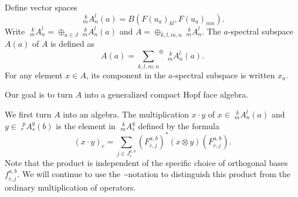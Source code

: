\documentclass[12pt]{article}
\theoremstyle{change}
\newcommand{\CatC}{\mathcal{C}}
\newcommand{\Mor}{\mathrm{Mor}}
\newcommand{\Gr}[5]{\;{}^{\;#2}_{#4}#1_{#5}^{#3}}%
\newcommand{\iitimes}{\underset{I}{\otimes}}
\newcommand{\osum}[1]{\underset{#1}{\sum}^{\oplus}}
\theoremstyle{definition}
\numberwithin{equation}{section}
\begin{document}


Define vector spaces \[\Gr{A}{k}{l}{m}{n}(a) = B(F(u_a)_{kl}, F(u_a)_{mn}).\] Write $\Gr{A}{k}{l}{m}{n} = \oplus_{a\in J} \Gr{A}{k}{l}{m}{n}(a)$ and $A = \oplus_{k,l,m,n} \Gr{A}{k}{l}{m}{n}$. The $a$-spectral subspace $A(a)$ of $A$ is defined as \[A(a) = \osum{k,l,m,n} \Gr{A}{k}{l}{m}{n}(a).\] For any element $x\in A$, its component in the $a$-spectral subspace is written $x_a$.

Our goal is to turn $A$ into a generalized compact Hopf face algebra.



We first turn $A$ into an algebra. The multiplication $x\cdot y$ of $x\in \Gr{A}{k}{l}{m}{n}(a)$ and $y\in \Gr{A}{p}{q}{r}{s}(b)$ is the element in $\Gr{A}{k}{q}{m}{s}$ defined by the formula \[(x\cdot y)_c = \sum_{j\in J^{a,b}_c} \left(F^{a,b}_{c,j}\right)^*(x\otimes y)\left( F^{a,b}_{c,j}\right).\] Note that the product is independent of the specific choice of orthogonal bases $f^{a,b}_{c,j}$. We will continue to use the $\cdot$-notation to distinguish this product from the ordinary multiplication of operators.
\end{document}
